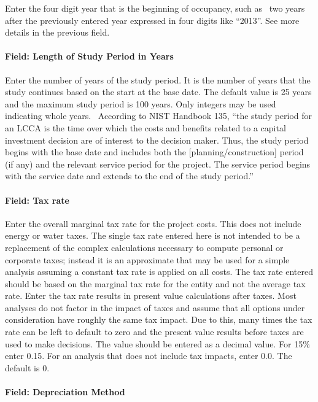 Enter the four digit year that is the beginning of occupancy, such as~ two years after the previously entered year expressed in four digits like ``2013''. See more details in the previous field.

\paragraph{Field: Length of Study Period in Years}\label{field-length-of-study-period-in-years}

Enter the number of years of the study period. It is the number of years that the study continues based on the start at the base date. The default value is 25 years and the maximum study period is 100 years. Only integers may be used indicating whole years.~ According to NIST Handbook 135, ``the study period for an LCCA is the time over which the costs and benefits related to a capital investment decision are of interest to the decision maker. Thus, the study period begins with the base date and includes both the {[}planning/construction{]} period (if any) and the relevant service period for the project. The service period begins with the service date and extends to the end of the study period.''

\paragraph{Field: Tax rate}\label{field-tax-rate}

Enter the overall marginal tax rate for the project costs. This does not include energy or water taxes. The single tax rate entered here is not intended to be a replacement of the complex calculations necessary to compute personal or corporate taxes; instead it is an approximate that may be used for a simple analysis assuming a constant tax rate is applied on all costs. The tax rate entered should be based on the marginal tax rate for the entity and not the average tax rate. Enter the tax rate results in present value calculations after taxes. Most analyses do not factor in the impact of taxes and assume that all options under consideration have roughly the same tax impact. Due to this, many times the tax rate can be left to default to zero and the present value results before taxes are used to make decisions. The value should be entered as a decimal value. For 15\% enter 0.15. For an analysis that does not include tax impacts, enter 0.0. The default is 0.

\paragraph{Field: Depreciation Method}\label{field-depreciation-method}

